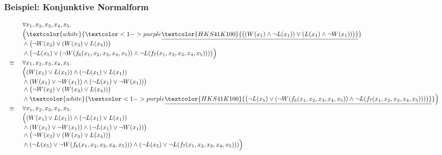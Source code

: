 \documentclass[aspectratio=1610,onlymath]{beamer}
\begin{document}
\newcommand{\hi}[2]{\textcolor{white}{\textcolor<#1>{purple}{\underline{\textcolor{HKS41K100}{#2}}}}}
\begin{frame}\frametitle{Beispiel: Konjunktive Normalform}

\footnotesize
\[\begin{array}{rl}
& \forall x_1,x_2,x_3,x_4,x_5.\\
& \Big(\hi{1-}{\big((W(x_1)\wedge\neg L(x_1))\vee (L(x_1)\wedge\neg W(x_1))\big)}\\
& {}\wedge{}  \big(\neg W(x_2)\vee(W(x_3) \vee L(x_4))\big)\\
& {}\wedge{}  \big(\neg L(x_5)\vee(\neg W(f_6(x_1,x_2,x_3,x_4,x_5)) \wedge \neg L(f_7(x_1,x_2,x_3,x_4,x_5)))\big)\Big)\\
{}\equiv{} & \forall x_1,x_2,x_3,x_4,x_5.\\
& \Big((W(x_1)\vee L(x_1))\wedge(\neg L(x_1)\vee L(x_1))\\
& {}\wedge (W(x_1)\vee \neg W(x_1))\wedge(\neg L(x_1)\vee \neg W(x_1))\big)\\
& {}\wedge{}  \big(\neg W(x_2)\vee(W(x_3) \vee L(x_4))\big)\\
& {}\wedge{}  \hi{1-}{\big(\neg L(x_5)\vee(\neg W(f_6(x_1,x_2,x_3,x_4,x_5)) \wedge \neg L(f_7(x_1,x_2,x_3,x_4,x_5)))\big)}\Big)\\
{}\equiv{} & \forall x_1,x_2,x_3,x_4,x_5.\\
& \Big((W(x_1)\vee L(x_1))\wedge(\neg L(x_1)\vee L(x_1))\\
& {}\wedge (W(x_1)\vee \neg W(x_1))\wedge(\neg L(x_1)\vee \neg W(x_1))\big)\\
& {}\wedge{}  \big(\neg W(x_2)\vee(W(x_3) \vee L(x_4))\big)\\
& {}\wedge{}  (\neg L(x_5)\vee\neg W(f_6(x_1,x_2,x_3,x_4,x_5))) \wedge (\neg L(x_5)\vee\neg L(f_7(x_1,x_2,x_3,x_4,x_5)))\Big)
\end{array}
\]

\end{frame}
\end{document}
